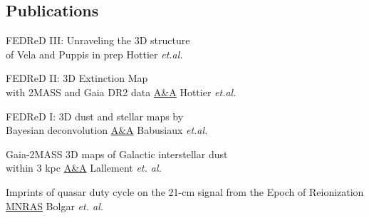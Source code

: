 \documentclass[
 a4paper, 9.5pt,
  sidebarwidth=0.28\paperwidth,
]{fortysecondscv}
\begin{document}
\makefrontsidebar

\begin{cvtable}
\end{cvtable}


\begin{cvtable}
\end{cvtable}

\subsection{Publications}
\begin{cvtable}
  {FEDReD III: Unraveling the 3D structure \\of Vela and Puppis}
  {in prep}
  {Hottier \textit{et.al.}}

  {FEDReD II: 3D Extinction Map\\ with 2MASS and Gaia DR2 data}
  {\href{https://ui.adsabs.harvard.edu/abs/2020arXiv200703734H/abstract}{A\&A}}
  {Hottier \textit{et.al.}}

  {FEDReD I: 3D dust and stellar maps by \\Bayesian deconvolution}
  {\href{https://ui.adsabs.harvard.edu/abs/2020arXiv200704455B/abstract}{A\&A}}
  {Babusiaux \textit{et.al.}}

  {Gaia-2MASS 3D maps of Galactic interstellar dust\\within 3 kpc}
  {\href{https://ui.adsabs.harvard.edu/\#abs/2019arXiv190204116L/abstract}{A\&A}}
  {Lallement \textit{et. al.}}

  {Imprints of quasar duty cycle on the 21-cm signal from the Epoch of Reionization}
  {\href{https://ui.adsabs.harvard.edu/\#abs/2019arXiv190204116L/abstract}{MNRAS}}
  {Bolgar \textit{et. al.}}
\end{cvtable}
\end{document}
